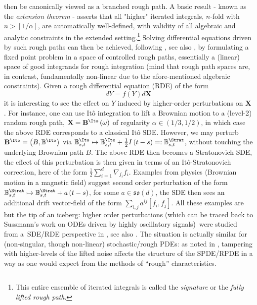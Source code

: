 \documentclass{article}
\begin{document}
then be canonically viewed as a branched rough path. A basic result -
known as the \textit{extension theorem} \cite{Lyons98, Gubinelli10} - asserts that
all "higher" iterated integrals, $n$-fold with $n>\left[ 1/\alpha \right] $,
are automatically well-defined, with validity of all algebraic and analytic
constraints in the extended setting.\footnote{This entire ensemble of iterated integrals is called the {\it signature} or the {\it fully lifted rough path}.} Solving differential equations driven
by such rough paths can then be achieved, following
\cite{Gubinelli04}, see also \cite{FrizHairer14}, by formulating a fixed point problem in a space
of controlled rough paths, essentially a (linear) space of good integrands
for rough integration (mind that rough path spaces are, in contrast,
fundamentally non-linear due to the afore-mentioned algebraic constraints).
Given a rough differential equation (RDE) of the form%
\[
dY=f\left( Y\right) d\mathbf{X}
\]%
it is interesting to see the effect on $Y$ induced by higher-order
perturbations on $\mathbf{X}$. For instance, one can use It\^{o} integration
to lift a Brownian motion to a (level-2) random rough path, $\mathbf{X}=%
\mathbf{B}^{\Ito}\left( \omega \right) $ of regularity $\alpha \in \left(
1/3,1/2\right) $, in which case the above RDE corresponds to a classical It{\^o}
SDE. However, we may perturb $\mathbf{B}^{\Ito}=\left( B,\mathbb{B}%
^{\Ito}\right) $ via $\mathbb{B}_{s,t}^{\Ito}\mapsto \mathbb{B}_{s,t}^{\Ito}+%
\frac{1}{2}I\left( t-s\right) =:\mathbb{B}_{s,t}^{\Strat}$, without touching
the underlying Brownian path $B$. The above RDE then becomes a Stratonovich
SDE, the effect of this perturbation is then given in terms of an
It{\^o}-Stratonovich correction, here of the form $\frac{1}{2}%
\sum_{i=1}^{d}\nabla _{f_{i}}f_{i}$. Examples from physics (Brownian motion
in a magnetic field) suggest second order perturbation of the form $\mathbb{B%
}_{s,t}^{\Strat}\mapsto \mathbb{B}_{s,t}^{\Strat}+a\left( t-s\right) $, for
some $a\in \mathfrak{so}\left( d\right) $, the SDE then sees an additional drift
vector-field of the form $\sum_{i,j}a^{ij}\left[ f_{i},f_{j}\right] $. All
these examples are but the tip of an iceberg: higher order perturbations
(which can be traced back to Sussmann's work on ODEs driven by highly
oscillatory signals)\ were studied from a\ SDE/RDE perspective in
\cite{FrizOberhauser09}, see also \cite{FrizVictoir10}. The situation is
actually similar for (non-singular, though non-linear) stochastic/rough PDEs: as noted
in  \cite{CFO11}, tampering with higher-levels of the lifted noise affects the structure of the SPDE/RPDE
in a way as one would expect from the methods of ``rough'' characteristics. 
\end{document}
